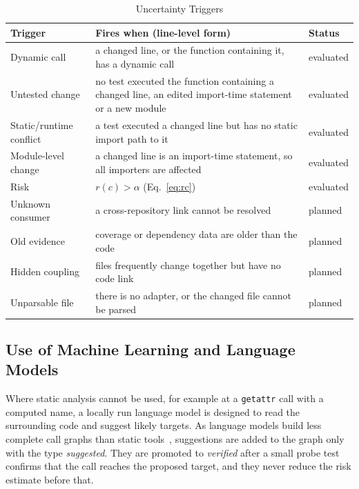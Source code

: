 \documentclass[conference]{IEEEtran}
\begin{document}
\begin{table}[t]
\caption{Uncertainty Triggers}
\label{tab:triggers}
\centering
\footnotesize
\setlength{\tabcolsep}{3pt}
\begin{tabular}{@{}>{\raggedright\arraybackslash}p{}>{\raggedright\arraybackslash}p{}>{\raggedright\arraybackslash}p{}@{}}
\toprule
\textbf{Trigger} & \textbf{Fires when (line-level form)} & \textbf{Status} \\
\midrule
Dynamic call & a changed line, or the function containing it, has a dynamic call & evaluated \\
Untested change & no test executed the function containing a changed line, an edited import-time statement or a new module & evaluated \\
Static/runtime conflict & a test executed a changed line but has no static import path to it & evaluated \\
Module-level change & a changed line is an import-time statement, so all importers are affected & evaluated \\
\midrule
Risk & $r(c) > \alpha$ (Eq.~\ref{eq:rc}) & evaluated \\
\midrule
Unknown consumer & a cross-repository link cannot be resolved & planned \\
Old evidence & coverage or dependency data are older than the code & planned \\
Hidden coupling & files frequently change together but have no code link & planned \\
Unparsable file & there is no adapter, or the changed file cannot be parsed & planned \\
\bottomrule
\end{tabular}
\end{table}

\subsection{Use of Machine Learning and Language Models}
Where static analysis cannot be used, for example at a \texttt{getattr} call with a computed name, a locally run language model is designed to read the surrounding code and suggest likely targets. As language models build less complete call graphs than static tools~\cite{venkatesh2025llmcg}, suggestions are added to the graph only with the type \emph{suggested}. They are promoted to \emph{verified} after a small probe test confirms that the call reaches the proposed target, and they never reduce the risk estimate before that.
\end{document}
